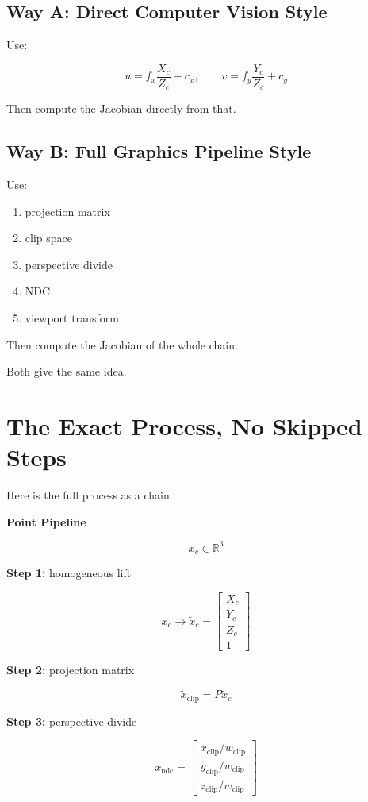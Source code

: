 \documentclass[11pt,letterpaper]{article}
\begin{document}
\subsection{Way A: Direct Computer Vision Style}

Use:

\[
u = f_x \frac{X_c}{Z_c} + c_x,\qquad
v = f_y \frac{Y_c}{Z_c} + c_y
\]

Then compute the Jacobian directly from that.

\subsection{Way B: Full Graphics Pipeline Style}

Use:

\begin{enumerate}
\item projection matrix
\item clip space
\item perspective divide
\item NDC
\item viewport transform
\end{enumerate}

Then compute the Jacobian of the whole chain.

Both give the same idea.

\section{The Exact Process, No Skipped Steps}

Here is the full process as a chain.

\textbf{Point Pipeline}

\[
x_c \in \mathbb{R}^3
\]

\textbf{Step 1:} homogeneous lift

\[
x_c \to \tilde{x}_c =
\begin{bmatrix}
X_c\\
Y_c\\
Z_c\\
1
\end{bmatrix}
\]

\textbf{Step 2:} projection matrix

\[
\tilde{x}_{\text{clip}} = P \tilde{x}_c
\]

\textbf{Step 3:} perspective divide

\[
x_{\text{ndc}} =
\begin{bmatrix}
x_{\text{clip}} / w_{\text{clip}}\\
y_{\text{clip}} / w_{\text{clip}}\\
z_{\text{clip}} / w_{\text{clip}}
\end{bmatrix}
\]
\end{document}
